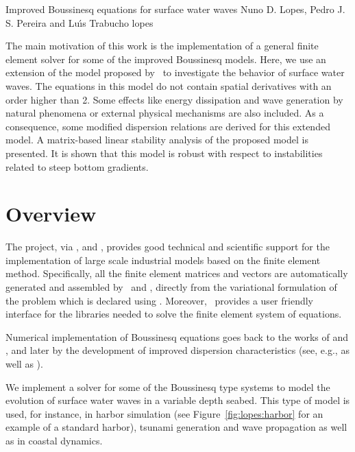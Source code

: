               {Improved Boussinesq equations for surface water waves}
              {Nuno D. Lopes, Pedro J. S. Pereira and Lu{\'\i}s Trabucho}
              {lopes}

The main motivation of this work is the implementation of a
general finite element solver for some of the improved Boussinesq
models. Here, we use an extension of the model
proposed by~\citet{ZhaoTengCheng2004} to investigate the behavior
of surface water waves. The equations in this model do not contain
spatial derivatives with an order higher than 2. Some effects like
energy dissipation and wave generation by natural phenomena or external
physical mechanisms are also included.  As a consequence, some modified
dispersion relations are derived for this extended model. A matrix-based
linear stability analysis of the proposed model is presented.  It is
shown that this model is robust with respect to instabilities related
to steep bottom gradients.

\section{Overview}

The \fenics project, via \dolfin, \ufl and \ffc, provides good technical
and scientific support for the implementation of large scale industrial
models based on the finite element method. Specifically, all the finite
element matrices and vectors are automatically generated and assembled
by \dolfin\ and \ffc, directly from the variational formulation of the
problem which is declared using \ufl. Moreover, \dolfin\ provides a user
friendly interface for the libraries needed to solve the finite element
system of equations.

Numerical implementation of Boussinesq equations goes back to
the works of \citet{Peregrine1967} and \citet{Wu1981}, and later
by the development of improved dispersion characteristics (see,
e.g., \citet{MadsenEtAl1991,Nwogu1993,ChenLiu1994} as well as
\citet{BejiNadaoka1996}).

We implement a solver for some of the Boussinesq type systems to model the
evolution of surface water waves in a variable depth
seabed.  This type of model is used, for instance, in harbor simulation
(see Figure~\ref{fig:lopes:harbor} for an example of a standard harbor),
tsunami generation and wave propagation as well as in coastal dynamics.


